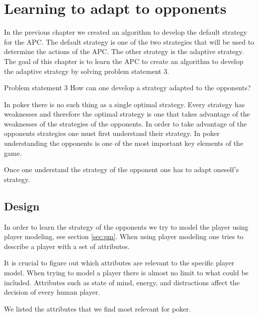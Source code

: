 \section{Learning to adapt to opponents}
\label{sec:part3}

In the previous chapter we created an algorithm to develop the default strategy for the APC. The default strategy is one of the two strategies that will be used to determine the actions of the APC. The other strategy is the adaptive strategy. \\

The goal of this chapter is to learn the APC to create an algorithm to develop the adaptive strategy by solving problem statement 3.

\vspace{4mm}
\begin{statementBox2}{Problem statement 3}
  How can one develop a strategy adapted to the opponents?
\end{statementBox2}
\vspace{4mm} 

In poker there is no such thing as a single optimal strategy. Every strategy has weaknesses and therefore the optimal strategy is one that takes advantage of the weaknesses of the strategies of the opponents. In order to take advantage of the opponents strategies one must first understand their strategy. In poker understanding the opponents is one of the most important key elements of the game. 

Once one understand the strategy of the opponent one has to adapt oneself's strategy.

\subsection{Design}
In order to learn the strategy of the opponents we try to model the player using player modeling, see section \ref{sec:pm}. When using player modeling one tries to describe a player with a set of attributes.

It is crucial to figure out which attributes are relevant to the specific player model. When trying to model a player there is almost no limit to what could be included. Attributes such as state of mind, energy, and distractions affect the decision of every human player.  

We listed the attributes that we find most relevant for poker.

